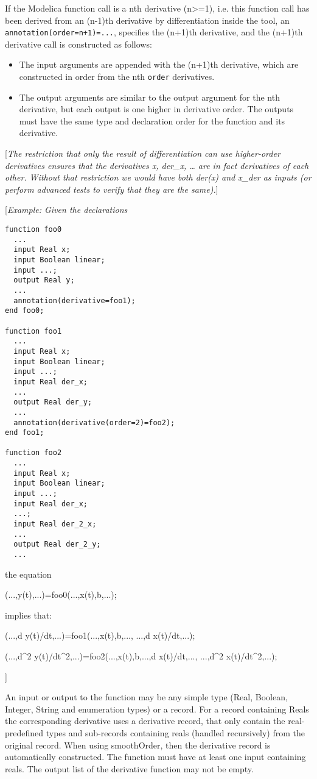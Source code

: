 If the Modelica function call is a nth derivative (n\textgreater{}=1),
i.e. this function call has been derived from an (n-1)th derivative by
differentiation inside the tool, an \lstinline!annotation(order=n+1)=...!,
specifies the (n+1)th derivative, and the (n+1)th derivative call is
constructed as follows:

\begin{itemize}
\item
  The input arguments are appended with the (n+1)th derivative, which
  are constructed in order from the nth \lstinline!order! derivatives.
\item
  The output arguments are similar to the output argument for the nth
  derivative, but each output is one higher in derivative order. The
  outputs must have the same type and declaration order for the function
  and its derivative.
\end{itemize}

{[}\emph{The restriction that only the result of differentiation can use
higher-order derivatives ensures that the derivatives x, der\_x,
\ldots{} are in fact derivatives of each other. Without that restriction
we would have both der(x) and x\_der as inputs (or perform advanced
tests to verify that they are the same).}{]}

{[}\emph{Example: Given the declarations}

\begin{lstlisting}[language=modelica]
function foo0
  ...
  input Real x;
  input Boolean linear;
  input ...;
  output Real y;
  ...
  annotation(derivative=foo1);
end foo0;

function foo1
  ...
  input Real x;
  input Boolean linear;
  input ...;
  input Real der_x;
  ...
  output Real der_y;
  ...
  annotation(derivative(order=2)=foo2);
end foo1;

function foo2
  ...
  input Real x;
  input Boolean linear;
  input ...;
  input Real der_x;
  ...;
  input Real der_2_x;
  ...
  output Real der_2_y;
  ...
\end{lstlisting}
the equation

(...,y(t),...)=foo0(...,x(t),b,...);

implies that:

(...,d y(t)/dt,...)=foo1(...,x(t),b,..., ...,d x(t)/dt,...);

(...,d\^{}2 y(t)/dt\^{}2,...)=foo2(...,x(t),b,...,d x(t)/dt,...,
...,d\^{}2 x(t)/dt\^{}2,...);

{]}

An input or output to the function may be any simple type (Real,
Boolean, Integer, String and enumeration types) or a record. For a
record containing Reals the corresponding derivative uses a derivative
record, that only contain the real-predefined types and sub-records
containing reals (handled recursively) from the original record. When
using smoothOrder, then the derivative record is automatically
constructed. The function must have at least one input containing reals.
The output list of the derivative function may not be empty.

